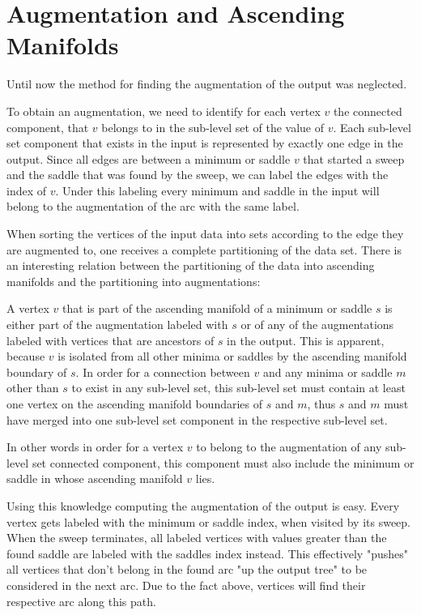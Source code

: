 \documentclass[%
	paper=A4,					%
	twoside=true,				%
	openright,					%
	parskip=full,				%
	chapterprefix=true,			%
	11pt,						%
	headings=normal,			%
	bibliography=totoc,			%
	listof=totoc,				%
	titlepage=on,				%
	captions=tableabove,		%
	draft=false,				%
]{scrreprt}%
\begin{document}
\section{Augmentation and Ascending Manifolds}
Until now the method for finding the augmentation of the output was neglected. 

To obtain an augmentation, we need to identify for each vertex \(v\) the connected component, that \(v\) belongs to in the sub-level set of the value of \(v\). Each sub-level set component that exists in the input is represented by exactly one edge in the output. Since all edges are between a minimum or saddle \(v\) that started a sweep and the saddle that was found by the sweep, we can label the edges with the index of \(v\). Under this labeling every minimum and saddle in the input will belong to the augmentation of the arc with the same label. 

When sorting the vertices of the input data into sets according to the edge they are augmented to, one receives a complete partitioning of the data set. There is an interesting relation between the partitioning of the data into ascending manifolds and the partitioning into augmentations:

A vertex \(v\) that is part of the ascending manifold of a minimum or saddle \(s\) is either part of the augmentation labeled with \(s\) or of any of the augmentations labeled with vertices that are ancestors of \(s\) in the output. This is apparent, because \(v\) is isolated from all other minima or saddles by the ascending manifold boundary of \(s\). In order for a connection between \(v\) and any minima or saddle \(m\) other than \(s\) to exist in any sub-level set, this sub-level set must contain at least one vertex on the ascending manifold boundaries of \(s\) and \(m\), thus \(s\) and \(m\) must have merged into one sub-level set component in the respective sub-level set. 

In other words in order for a vertex \(v\) to belong to the augmentation of any sub-level set connected component, this component must also include the minimum or saddle in whose ascending manifold \(v\) lies.

Using this knowledge computing the augmentation of the output is easy. Every vertex gets labeled with the minimum or saddle index, when visited by its sweep. When the sweep terminates, all labeled vertices with values greater than the found saddle are labeled with the saddles index instead. This effectively "pushes" all vertices that don't belong in the found arc "up the output tree" to be considered in the next arc. Due to the fact above, vertices will find their respective arc along this path. 
\end{document}
